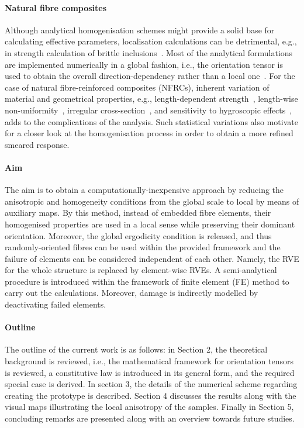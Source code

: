 	\paragraph{Natural fibre composites} Although analytical homogenisation schemes might provide a solid base for calculating effective parameters, localisation calculations can be detrimental, e.g., in strength calculation of brittle inclusions~\autocite{Bohm.2020}. Most of the analytical formulations are implemented numerically in a global fashion, i.e., the orientation tensor is used to obtain the overall direction-dependency rather than a local one~\autocite{Spencer.1984}. For the case of natural fibre-reinforced composites (NFRCs), inherent variation of material and geometrical properties, e.g., length-dependent strength~\autocite{Virk.2013}, length-wise non-uniformity~\autocite{Virk.2009}, irregular cross-section~\autocite{Virk.2009}, and sensitivity to hygroscopic effects~\autocite{Javanbakht.2017b}, adds to the complications of the analysis. Such statistical variations also motivate for a closer look at the homogenisation process in order to obtain a more refined smeared response.	


	



	
	
	\paragraph{Aim} The aim is to obtain a computationally-inexpensive approach by reducing the anisotropic and homogeneity conditions from the global scale to local by means of auxiliary maps. By this method, instead of embedded fibre elements, their homogenised properties are used in a local sense while preserving their dominant orientation. Moreover, the global ergodicity condition is released, and thus randomly-oriented fibres can be used within the provided framework and the failure of elements can be considered independent of each other. Namely, the RVE for the whole structure is replaced by element-wise RVEs. A semi-analytical procedure is introduced within the framework of finite element (FE) method to carry out the calculations. Moreover, damage is indirectly modelled by deactivating failed elements.
	
	\paragraph{Outline} The outline of the current work is as follows: in Section 2, the theoretical background is reviewed, i.e., the mathematical framework for orientation tensors is reviewed, a constitutive law is introduced in its general form, and the required special case is derived. In section 3, the details of the numerical scheme regarding creating the prototype is described. Section 4 discusses the results along with the visual maps illustrating the local anisotropy of the samples. Finally in Section 5, concluding remarks are presented along with an overview towards future studies.
	
